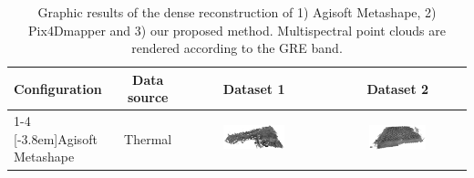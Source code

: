 \begin{table}[hb]
    \centering
    \caption{Graphic results of the dense reconstruction of 1) Agisoft Metashape, 2) Pix4Dmapper and 3) our proposed method. Multispectral point clouds are rendered according to the GRE band. }
    \label{table:visual_results}  
    \newcommand\imageTableSize{0.45\textwidth}
    \begin{tabular}{l|c|c|c}
    \toprule
    \textbf{Configuration} & \textbf{Data source} &\textbf{Dataset 1} & \textbf{Dataset 2}\\
    \cmidrule{1-4}
    \multirow{2}{*}[-3.8em]{Agisoft Metashape} & Thermal & \multicolumn{1}{m{\imageTableSize}|}{\includegraphics[width=\imageTableSize]{figs/multi_thermal_projection/results/metashape/AgisoftThermalMarmolejo.png}} & \multicolumn{1}{m{\imageTableSize}}{\includegraphics[width=\imageTableSize]{figs/multi_thermal_projection/results/metashape/AgisoftThermalNovember.png}}\\

\end{tabular}
\end{table}
